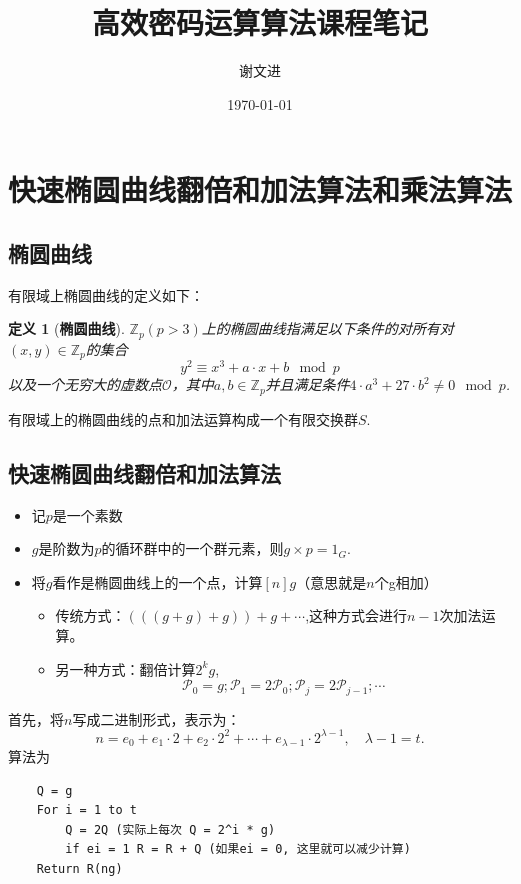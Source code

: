 \documentclass[10pt]{ctexart}
\title{高效密码运算算法课程笔记}
\author{谢文进}
\date{\today}
\newtheorem{definition}{定义}
\begin{document}
\maketitle
\tableofcontents
\section{快速椭圆曲线翻倍和加法算法和乘法算法}
\subsection{椭圆曲线}
有限域上椭圆曲线的定义如下：
\begin{definition}[\textbf{椭圆曲线}]
    $\mathbb{Z}_p(p>3)$上的椭圆曲线指满足以下条件的对所有对$(x,y) \in \mathbb{Z}_p$的集合
    \begin{equation}
        y^2 \equiv x^3 + a \cdot x + b \mod p
    \end{equation}
    以及一个无穷大的虚数点$\mathcal{O}$，其中$a,b \in \mathbb{Z}_p$并且满足条件$4 \cdot a^3 + 27 \cdot b^2 \neq 0 \mod p$.
\end{definition}
有限域上的椭圆曲线的点和加法运算构成一个有限交换群$S$.

\subsection{快速椭圆曲线翻倍和加法算法}
\begin{itemize}
    \item 记$p$是一个素数
    \item $g$是阶数为$p$的循环群中的一个群元素，则$g \times p = 1_G$.
    \item 将$g$看作是椭圆曲线上的一个点，计算$[n]g$（意思就是$n$个g相加）
    \begin{itemize}
        \item 传统方式：$(((g + g) + g)) + g + \cdots$,这种方式会进行$n-1$次加法运算。
        \item 另一种方式：翻倍计算$2^kg$,
        $$
        \mathcal{P}_0 = g; \mathcal{P}_1 = 2 \mathcal{P}_0; \mathcal{P}_j = 2 \mathcal{P}_{j-1}; \cdots
        $$
    \end{itemize} 
\end{itemize}
首先，将$n$写成二进制形式，表示为：
\begin{displaymath}
    n = e_0 + e_1 \cdot 2 + e_2 \cdot 2^2 + \cdots + e_{\lambda - 1} \cdot 2 ^{\lambda - 1}, \quad \lambda - 1 = t.
\end{displaymath}
算法为
\begin{lstlisting}
    Q = g
    For i = 1 to t
        Q = 2Q (实际上每次 Q = 2^i * g)
        if ei = 1 R = R + Q (如果ei = 0, 这里就可以减少计算)
    Return R(ng)
\end{lstlisting}
\end{document}
